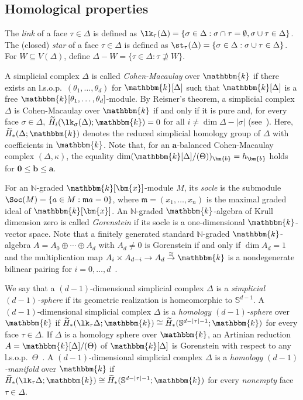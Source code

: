 \subsection{Homological properties}
The \emph{link} of a face $\tau \in \Delta$ is defined as $\lk_\tau(\Delta)=\{\sigma \in \Delta:\sigma \cap \tau = \emptyset, \sigma \cup \tau \in \Delta\}$. The (closed) \emph{star} of a face $\tau \in \Delta$ is defined as $\st_\tau(\Delta)=\{\sigma \in \Delta: \sigma \cup \tau \in \Delta\}$.
For $W \subseteq V(\Delta)$, define $\Delta -W=\{\tau \in \Delta:\tau \not\supseteq W\}$.

A simplicial complex $\Delta$ is called \emph{Cohen-Macaulay} over $\mathbbm{k}$ if there exists an l.s.o.p.~$(\theta_1,\ldots,\theta_d)$ for $\mathbbm{k}[\Delta]$ such that $\mathbbm{k}[\Delta]$ is a free $\mathbbm{k}[\theta_1,\ldots,\theta_d]$-module.
By Reisner's theorem, a simplicial complex $\Delta$ is Cohen-Macaulay over $\mathbbm{k}$ if and only if it is pure and, for every face $\sigma \in \Delta$, $\widetilde{H}_i(\lk_\sigma(\Delta);\mathbbm{k})=0$ for all $i \neq \dim\Delta - |\sigma|$ (see~\cite[Corollary II.4.2]{Sta-book}). 
Here, $\widetilde{H}_*(\Delta;\mathbbm{k})$ denotes the reduced simplicial homology group of $\Delta$ with coefficients in $\mathbbm{k}$.
Note that, for an $\bm{a}$-balanced Cohen-Macaulay complex $(\Delta,\kappa)$, the equality $\dim (\mathbbm{k}[\Delta]/(\Theta))_{\bm{b}} = h_{\bm{b}}$ holds for $\bm{0} \leq \bm{b} \leq \bm{a}$.

For an $\mathbb{N}$-graded $\mathbbm{k}[\bm{x}]$-module $M$, its \emph{socle} is the submodule $\Soc(M)=\{a \in M: \mathfrak{m}a=0\}$, where $\mathfrak{m}=(x_1,\ldots,x_n)$ is the maximal graded ideal of $\mathbbm{k}[\bm{x}]$.
An $\mathbb{N}$-graded $\mathbbm{k}$-algebra of Krull dimension zero is called \emph{Gorenstein} if its socle is a one-dimensional $\mathbbm{k}$-vector space.
Note that a finitely generated standard $\mathbb{N}$-graded $\mathbbm{k}$-algebra $A=A_0\oplus \cdots \oplus A_d$ with $A_d \neq 0$ is Gorenstein if and only if $\dim A_d =1$ and the multiplication map $A_i \times A_{d-i} \rightarrow A_d \overset{\cong}{\rightarrow} \mathbbm{k}$ is a nondegenerate bilinear pairing for $i=0,\ldots,d$~\cite[Lemma 36]{AY}.

We say that a $(d-1)$-dimensional simplicial complex $\Delta$ is a \emph{simplicial $(d-1)$-sphere} if its geometric realization is homeomorphic to $\mathbb{S}^{d-1}$. A $(d-1)$-dimensional simplicial complex $\Delta$ is a \emph{homology $(d-1)$-sphere} over $\mathbbm{k}$ if $\widetilde{H}_*(\lk_{\tau}\Delta;\mathbbm{k}) \cong \widetilde{H}_*(\mathbb{S}^{d-|\tau|-1};\mathbbm{k})$ for every face $\tau \in \Delta$.
If $\Delta$ is a homology sphere over $\mathbbm{k}$, an Artinian reduction $A=\mathbbm{k}[\Delta]/(\Theta)$ of $\mathbbm{k}[\Delta]$ is Gorenstein with respect to any l.s.o.p.~$\Theta$~\cite[Theorem II.5.1]{Sta-book}.
A $(d-1)$-dimensional simplicial complex $\Delta$ is a \emph{homology $(d-1)$-manifold} over $\mathbbm{k}$ if $\widetilde{H}_*(\lk_{\tau}\Delta;\mathbbm{k}) \cong \widetilde{H}_*(\mathbb{S}^{d-|\tau|-1};\mathbbm{k})$ for every \emph{nonempty} face $\tau \in \Delta$.

